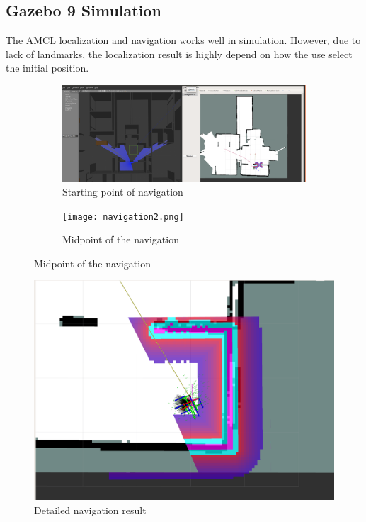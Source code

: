 \documentclass[letterpaper, 10 pt, conference]{ieeeconf}  %
\begin{document}
\subsection{Gazebo 9 Simulation}
The AMCL localization and navigation works well in simulation. However, due to lack of landmarks, the localization result is highly depend on how the use select the initial position.
    \begin{figure}[!pt]
    \begin{subfigure}[b]{0.5\textwidth}
       \includegraphics[width=1\linewidth]{navigation.png}
       \caption{Starting point of navigation}
       \label{fig:Ng1} 
    \end{subfigure}
    
    \begin{subfigure}[b]{0.5\textwidth}
       \texttt{[image: navigation2.png]}
       \caption{Midpoint of the navigation}
       \label{fig:Ng2}
    \end{subfigure}
\end{figure}

\begin{figure}[!pt]
  \includegraphics[width=\linewidth]{navigation_detail.png}
  \caption{Detailed navigation result} 
  \label{fig:navigation_detail}
\end{figure}{}
\end{document}
